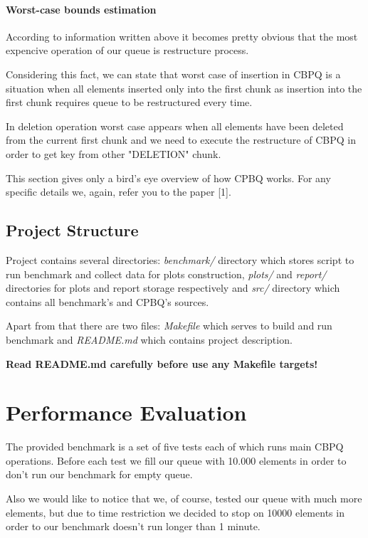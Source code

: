 \documentclass{article}
\begin{document}
\paragraph{Worst-case bounds estimation}\mbox{}\par 
According to information written above it becomes pretty obvious that the most expencive operation of our queue is restructure process.\par
Considering this fact, we can state that worst case of insertion in CBPQ is a situation when all elements inserted only into the first chunk as insertion into the first chunk requires queue to be restructured every time.\par
In deletion operation worst case appears when all elements have been deleted from the current first chunk and we need to execute the restructure of CBPQ in order to get key from other "DELETION" chunk.\newline\par
This section gives only a bird's eye overview of how CPBQ works. For any specific details we, again, refer you to the paper [1].

\subsection{Project Structure}\mbox{}\par
Project contains several directories:\textit{ benchmark/} directory which stores script to run benchmark and collect data for plots construction, \textit{plots/} and \textit{report/} directories for plots and report storage respectively and \textit{src/} directory which contains all benchmark's and CPBQ's sources.\par
Apart from that there are two files: \textit{Makefile} which serves to build and run benchmark and \textit{README.md} which contains project description.\par
\textbf{Read README.md carefully before use any Makefile targets!}

\section{Performance Evaluation}\mbox{}\par
The provided benchmark is a set of five tests each of which runs main CBPQ operations. Before each test we fill our queue with 10.000 elements in order to don't run our benchmark for empty queue.\par
Also we would like to notice that we, of course, tested our queue with much more elements, but due to time restriction we decided to stop on 10000 elements in order to our benchmark doesn't run longer than 1 minute.
\end{document}
